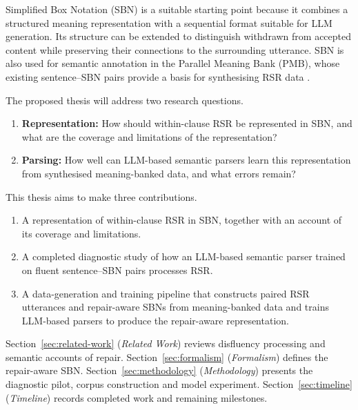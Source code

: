 Simplified Box Notation (SBN)
\citep{bosQuantificationAnnotationDiscourse2021,bosSequenceNotationCatching2023}
is a suitable starting point because it combines a structured meaning
representation with a sequential format suitable for LLM generation. Its
structure can be extended to distinguish withdrawn from accepted content while
preserving their connections to the surrounding utterance. SBN is also used
for semantic annotation in the Parallel Meaning Bank (PMB), whose existing
sentence--SBN pairs provide a basis for synthesising RSR data
\citep{abzianidzeParallelMeaningBank2017}.


The proposed thesis will address two research questions.

\begin{enumerate}
  \item \textbf{Representation:} How should within-clause RSR
        be represented in SBN, and what are the coverage and
        limitations of the representation?
  \item \textbf{Parsing:} How well can LLM-based semantic parsers learn this
        representation from synthesised meaning-banked data, and what errors
        remain?
\end{enumerate}

This thesis aims to make three contributions.

\begin{enumerate}[itemsep=0.2em]
  \item A representation of within-clause RSR in SBN,
        together with an account of its coverage and limitations.
  \item A completed diagnostic study of how an LLM-based semantic parser
        trained on fluent sentence--SBN pairs processes RSR.
  \item A data-generation and training pipeline that constructs paired RSR
        utterances and repair-aware SBNs from meaning-banked data and trains
        LLM-based parsers to produce the repair-aware representation.
\end{enumerate}


Section~\ref{sec:related-work} (\emph{Related Work}) reviews disfluency
processing and semantic accounts of repair. Section~\ref{sec:formalism}
(\emph{Formalism}) defines the repair-aware SBN. Section~\ref{sec:methodology}
(\emph{Methodology}) presents the diagnostic pilot, corpus construction and
model experiment. Section~\ref{sec:timeline} (\emph{Timeline}) records
completed work and remaining milestones.